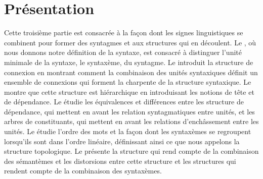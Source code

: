 \section*{Présentation}

Cette troisième partie est consacrée à la façon dont les signes linguistiques se combinent pour former des syntagmes et aux structures qui en découlent. Le , où nous donnons notre définition de la syntaxe, est consacré à distinguer l’unité minimale de la syntaxe, le syntaxème, du syntagme. Le  introduit la structure de connexion en montrant comment la combinaison des unités syntaxiques définit un ensemble de connexions qui forment la charpente de la structure syntaxique. Le  montre que cette structure est hiérarchique en introduisant les notions de tête et de dépendance. Le  étudie les équivalences et différences entre les structure de dépendance, qui mettent en avant les relation syntagmatiques entre unités, et les arbres de constituants, qui mettent en avant les relations d’enchâssement entre les unités. Le  étudie l’ordre des mots et la façon dont les syntaxèmes se regroupent lorsqu’ils sont dans l’ordre linéaire, définissant ainsi ce que nous appelons la structure topologique. Le  présente la structure qui rend compte de la combinaison des sémantèmes et les distorsions entre cette structure et les structures qui rendent compte de la combinaison des syntaxèmes. 
